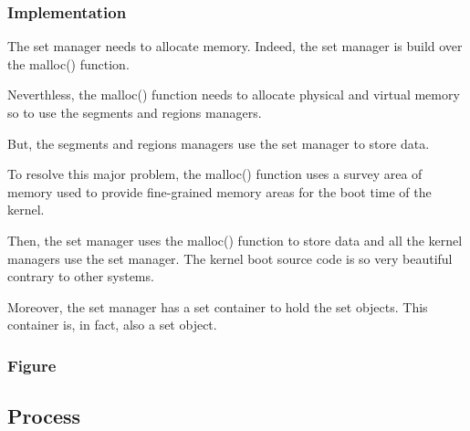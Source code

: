 
\begin{frame}
  \frametitle{Implementation}

  The set manager needs to allocate memory. Indeed, the set manager
  is build over the malloc() function.

  \nl

  Neverthless, the malloc() function needs to allocate physical and
  virtual memory so to use the segments and regions managers.

  \nl

  But, the segments and regions managers use the set manager to store data.

  \nl

  To resolve this major problem, the malloc() function uses a survey area
  of memory used to provide fine-grained memory areas for the boot time
  of the kernel.

  \nl

  Then, the set manager uses the malloc() function to store data and all
  the kernel managers use the set manager. The kernel boot source code
  is so very beautiful contrary to other systems.

  \nl

  Moreover, the set manager has a set container to hold the set objects. This
  container is, in fact, also a set object.
\end{frame}


\begin{frame}
  \frametitle{Figure}

  \begin{center}
  \end{center}
\end{frame}

%
%

\subsection{Process}


